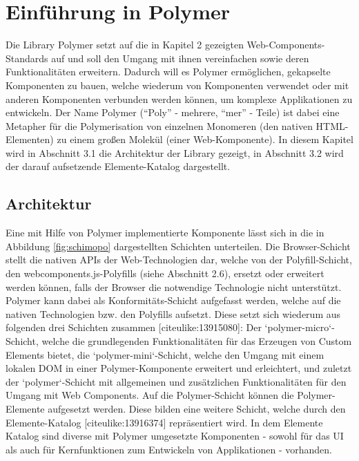 \chapter{Einführung in Polymer}\label{einfuxfchrung-in-polymer}

Die Library Polymer setzt auf die in Kapitel 2 gezeigten Web-Components-Standards auf und soll den Umgang mit ihnen vereinfachen sowie deren Funktionalitäten erweitern. Dadurch will es Polymer ermöglichen, gekapselte Komponenten zu bauen, welche wiederum von Komponenten verwendet oder mit anderen Komponenten verbunden werden können, um komplexe Applikationen zu entwickeln. Der Name Polymer (``Poly'' - mehrere, ``mer'' - Teile) ist dabei eine Metapher für die Polymerisation von einzelnen Monomeren (den nativen HTML-Elementen) zu einem großen Molekül (einer Web-Komponente). In diesem Kapitel wird in Abschnitt 3.1 die Architektur der Library gezeigt, in Abschnitt 3.2 wird der darauf aufsetzende Elemente-Katalog dargestellt.


\section{Architektur}\label{architektur}

Eine mit Hilfe von Polymer implementierte Komponente lässt sich in die in Abbildung \ref{fig:schimopo} dargestellten Schichten unterteilen. Die Browser-Schicht stellt die nativen APIs der Web-Technologien dar, welche von der Polyfill-Schicht, den webcomponents.js-Polyfills (siehe Abschnitt 2.6), ersetzt oder erweitert werden können, falls der Browser die notwendige Technologie nicht unterstützt. Polymer kann dabei als Konformitäts-Schicht aufgefasst werden, welche auf die nativen Technologien bzw. den Polyfills aufsetzt. Diese setzt sich wiederum aus folgenden drei Schichten zusammen [citeulike:13915080]: Der `polymer-micro`-Schicht, welche die grundlegenden Funktionalitäten für das Erzeugen von Custom Elements bietet, die `polymer-mini`-Schicht, welche den Umgang mit einem lokalen DOM in einer Polymer-Komponente erweitert und erleichtert, und zuletzt der `polymer`-Schicht mit allgemeinen und zusätzlichen Funktionalitäten für den Umgang mit Web Components. Auf die Polymer-Schicht können die Polymer-Elemente aufgesetzt werden. Diese bilden eine weitere Schicht, welche durch den Elemente-Katalog [citeulike:13916374] repräsentiert wird. In dem Elemente Katalog sind diverse mit Polymer umgesetzte Komponenten - sowohl für das UI als auch für Kernfunktionen zum Entwickeln von Applikationen - vorhanden.


